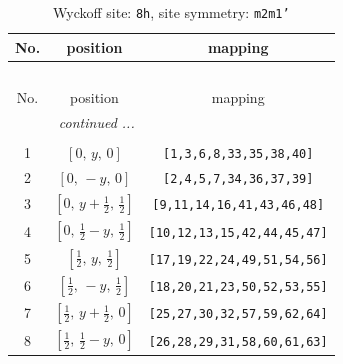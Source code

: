 \documentclass[fleqn,8pt]{jsarticle}
\begin{document}
\begin{longtable}{ccc}
\caption{Wyckoff site: {\tt 8h}, site symmetry: {\tt m2m1'}}
 \\
 \hline \hline
No. & position & mapping \\ \hline \endfirsthead

\multicolumn{2}{l}{\tablename\ \thetable{}} \\
 \hline \hline
No. & position & mapping \\ \hline \endhead

 \hline \hline
\multicolumn{2}{r}{\footnotesize\it continued ...} \\ \endfoot

 \hline \hline
\multicolumn{2}{r}{} \\ \endlastfoot

1 & $\left[ 0,\, y,\, 0 \right]$ & {\tt [1,3,6,8,33,35,38,40]} \\ \hline
2 & $\left[ 0,\, - y,\, 0 \right]$ & {\tt [2,4,5,7,34,36,37,39]} \\ \hline
3 & $\left[ 0,\, y + \frac{1}{2},\, \frac{1}{2} \right]$ & {\tt [9,11,14,16,41,43,46,48]} \\ \hline
4 & $\left[ 0,\, \frac{1}{2} - y,\, \frac{1}{2} \right]$ & {\tt [10,12,13,15,42,44,45,47]} \\ \hline
5 & $\left[ \frac{1}{2},\, y,\, \frac{1}{2} \right]$ & {\tt [17,19,22,24,49,51,54,56]} \\ \hline
6 & $\left[ \frac{1}{2},\, - y,\, \frac{1}{2} \right]$ & {\tt [18,20,21,23,50,52,53,55]} \\ \hline
7 & $\left[ \frac{1}{2},\, y + \frac{1}{2},\, 0 \right]$ & {\tt [25,27,30,32,57,59,62,64]} \\ \hline
8 & $\left[ \frac{1}{2},\, \frac{1}{2} - y,\, 0 \right]$ & {\tt [26,28,29,31,58,60,61,63]} \\
\end{longtable}
\renewcommand{\arraystretch}{1.2}
\end{document}
